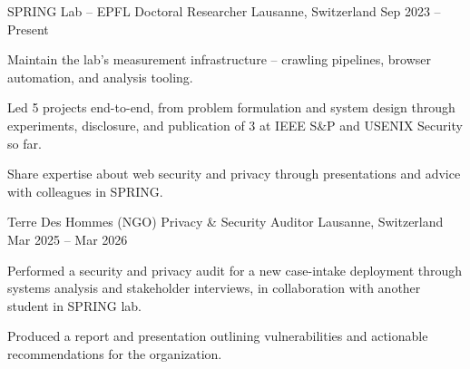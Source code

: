 

\begin{cventries}


  \cventry
  {SPRING Lab -- EPFL} %
  {Doctoral Researcher} %
  {Lausanne, Switzerland} %
  {Sep 2023 -- Present} %
  {
    \begin{cvitems} %
      \item{Maintain the lab's measurement infrastructure -- crawling pipelines, browser automation, and analysis tooling.}
      \item{Led 5 projects end-to-end, from problem formulation and system design through experiments, disclosure, and publication of 3 at IEEE S\&P and USENIX Security so far.}
      \item{Share expertise about web security and privacy through presentations and advice with colleagues in SPRING.}
    \end{cvitems}
  }

  \cventry
  {Terre Des Hommes (NGO)} %
  {Privacy \& Security Auditor} %
  {Lausanne, Switzerland} %
  {Mar 2025 -- Mar 2026} %
  {
    \begin{cvitems} %
      \item {Performed a security and privacy audit for a new case-intake deployment through systems analysis and stakeholder interviews, in collaboration with another student in SPRING lab.}
      \item {Produced a report and presentation outlining vulnerabilities and actionable recommendations for the organization.}
    \end{cvitems}
  }


\end{cventries}
